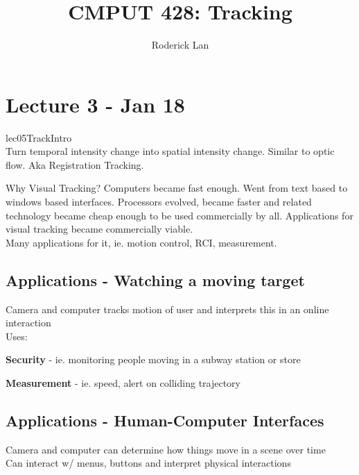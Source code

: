 \documentclass{article}
\title{CMPUT 428: Tracking}
\author{Roderick Lan}
\date{}
\begin{document}
\maketitle
\tableofcontents
\break

\section{Lecture 3 - Jan 18}
lec05TrackIntro\\
Turn temporal intensity change into spatial intensity change. 
Similar to optic flow. Aka Registration Tracking. 
\begin{expln}
    {Why Visual Tracking?}{}
    Computers became fast enough. Went from 
    text based to windows based interfaces. Processors evolved, became faster 
    and related technology became cheap enough to be used commercially by all.
    Applications for visual tracking became commercially viable. 
    \\
    Many applications for it, ie. motion control, RCI, measurement. 


\end{expln}
\subsection{Applications - Watching a moving target}
Camera and computer tracks motion of user and interprets this in an online interaction
\\
Uses:
\begin{list}{}{}
    \item \textbf{Security} - ie. monitoring people moving in a subway station or store
    \item \textbf{Measurement} - ie. speed, alert on colliding trajectory
\end{list}

\subsection{Applications - Human-Computer Interfaces}
Camera and computer can determine how things move in a scene over time
\\
Can interact w/ menus, buttons and interpret physical interactions
\end{document}
